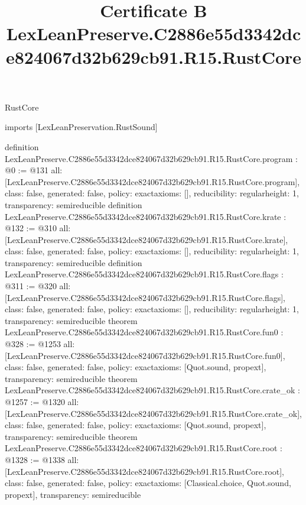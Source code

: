 \begin{lexlean}{RustCore}
\title{Certificate B LexLeanPreserve.C2886e55d3342dce824067d32b629cb91.R15.RustCore}
\begin{coremodule}
imports [LexLeanPreservation.RustSound]

definition LexLeanPreserve.C2886e55d3342dce824067d32b629cb91.R15.RustCore.program : @0 := @131 {
  all: [LexLeanPreserve.C2886e55d3342dce824067d32b629cb91.R15.RustCore.program],
  class: false,
  generated: false,
  policy: exact{axioms: []},
  reducibility: regular{height: 1},
  transparency: semireducible
}
definition LexLeanPreserve.C2886e55d3342dce824067d32b629cb91.R15.RustCore.krate : @132 := @310 {
  all: [LexLeanPreserve.C2886e55d3342dce824067d32b629cb91.R15.RustCore.krate],
  class: false,
  generated: false,
  policy: exact{axioms: []},
  reducibility: regular{height: 1},
  transparency: semireducible
}
definition LexLeanPreserve.C2886e55d3342dce824067d32b629cb91.R15.RustCore.flags : @311 := @320 {
  all: [LexLeanPreserve.C2886e55d3342dce824067d32b629cb91.R15.RustCore.flags],
  class: false,
  generated: false,
  policy: exact{axioms: []},
  reducibility: regular{height: 1},
  transparency: semireducible
}
theorem LexLeanPreserve.C2886e55d3342dce824067d32b629cb91.R15.RustCore.fun0 : @328 := @1253 {
  all: [LexLeanPreserve.C2886e55d3342dce824067d32b629cb91.R15.RustCore.fun0],
  class: false,
  generated: false,
  policy: exact{axioms: [Quot.sound, propext]},
  transparency: semireducible
}
theorem LexLeanPreserve.C2886e55d3342dce824067d32b629cb91.R15.RustCore.crate_ok : @1257 := @1320 {
  all: [LexLeanPreserve.C2886e55d3342dce824067d32b629cb91.R15.RustCore.crate_ok],
  class: false,
  generated: false,
  policy: exact{axioms: [Quot.sound, propext]},
  transparency: semireducible
}
theorem LexLeanPreserve.C2886e55d3342dce824067d32b629cb91.R15.RustCore.root : @1328 := @1338 {
  all: [LexLeanPreserve.C2886e55d3342dce824067d32b629cb91.R15.RustCore.root],
  class: false,
  generated: false,
  policy: exact{axioms: [Classical.choice, Quot.sound, propext]},
  transparency: semireducible
}


\end{coremodule}
\end{lexlean}
